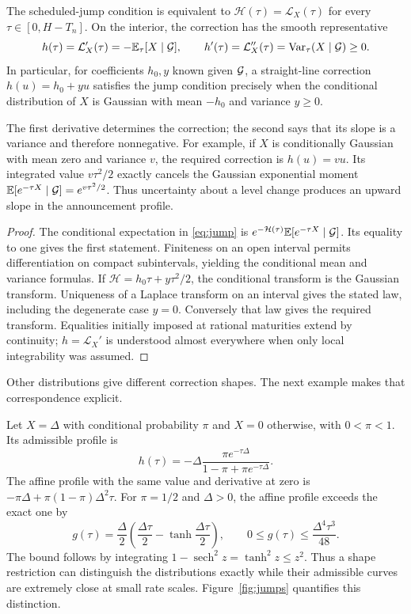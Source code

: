 \begin{proposition}\label{prop:profile}
The scheduled-jump condition is equivalent to $\mathcal H(\tau)=\mathcal L_X(\tau)$ for every $\tau\in[0,H-T_n]$. On the interior, the correction has the smooth representative
\begin{equation}
h(\tau)=\mathcal L_X'(\tau)=-\mathbb E_\tau[X\mid\mathcal G],\qquad
h'(\tau)=\mathcal L_X''(\tau)=\operatorname{Var}_\tau(X\mid\mathcal G)\ge0.\label{eq:profile}
\end{equation}
In particular, for coefficients $h_0,y$ known given $\mathcal G$, a straight-line correction $h(u)=h_0+yu$ satisfies the jump condition precisely when the conditional distribution of $X$ is Gaussian with mean $-h_0$ and variance $y\ge0$.
\end{proposition}
The first derivative determines the correction; the second says that its slope is a variance and therefore nonnegative. For example, if $X$ is conditionally Gaussian with mean zero and variance $v$, the required correction is $h(u)=vu$. Its integrated value $v\tau^2/2$ exactly cancels the Gaussian exponential moment $\mathbb E[e^{-\tau X}\mid\mathcal G]=e^{v\tau^2/2}$. Thus uncertainty about a level change produces an upward slope in the announcement profile.

\begin{proof}
The conditional expectation in \eqref{eq:jump} is $e^{-\mathcal H(\tau)}\mathbb E[e^{-\tau X}\mid\mathcal G]$. Its equality to one gives the first statement. Finiteness on an open interval permits differentiation on compact subintervals, yielding the conditional mean and variance formulas. If $\mathcal H=h_0\tau+y\tau^2/2$, the conditional transform is the Gaussian transform. Uniqueness of a Laplace transform on an interval gives the stated law, including the degenerate case $y=0$. Conversely that law gives the required transform. Equalities initially imposed at rational maturities extend by continuity; $h=\mathcal L_X'$ is understood almost everywhere when only local integrability was assumed.
\end{proof}

Other distributions give different correction shapes. The next example makes that correspondence explicit.

\begin{example}\label{ex:binary}
Let $X=\Delta$ with conditional probability $\pi$ and $X=0$ otherwise, with $0<\pi<1$. Its admissible profile is
\begin{equation}
h(\tau)=-\Delta\frac{\pi e^{-\tau\Delta}}{1-\pi+\pi e^{-\tau\Delta}}.
\end{equation}
The affine profile with the same value and derivative at zero is $-\pi\Delta+\pi(1-\pi)\Delta^2\tau$. For $\pi=1/2$ and $\Delta>0$, the affine profile exceeds the exact one by
\[
g(\tau)=\frac\Delta2\left(\frac{\Delta\tau}{2}-\tanh\frac{\Delta\tau}{2}\right),
\qquad 0\le g(\tau)\le\frac{\Delta^4\tau^3}{48}.
\]
The bound follows by integrating $1-\operatorname{sech}^2 z=\tanh^2z\le z^2$. Thus a shape restriction can distinguish the distributions exactly while their admissible curves are extremely close at small rate scales. Figure~\ref{fig:jumps} quantifies this distinction.
\end{example}

